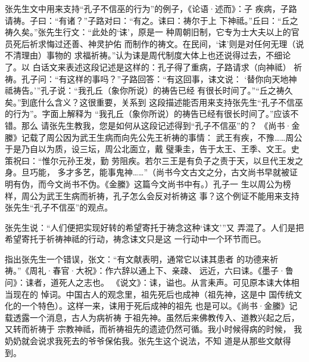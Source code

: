 张先生文中用来支持“孔子不信巫的行为”的例子，《论语·述而》：子
疾病，子路请祷。子曰：“有诸？”子路对曰：“有之。诔曰：祷尔于上
下神祗。”丘曰：“丘之祷久矣。”张先生行文：“此处的‘诔’，原是一
种周朝旧制，它专为士大夫以上的官员死后祈求悔过还善、神灵护佑
而制作的祷文。在民间，‘诔’则是对任何无理（说不清理由）事物的
求福祈祷。”认为诔是周代制度大体上也还说得过去，不细论了。以
白话文来表述这段记述是这样的：孔子得了重病，子路请求（向神祗）
祈祷。孔子问：“有这样的事吗？”子路回答：“有这回事，诔文说：
‘替你向天地神祗祷告。’”孔子说：“我孔丘（象你所说）的祷告已经
有很长时间了。”“丘之祷久矣。”到底什么含义？这很重要，关系到
这段描述能否用来支持张先生“孔子不信巫的行为”。字面上解释为
“我孔丘（象你所说）的祷告已经有很长时间了。”应该不错。那么
请张先生教我，您是如何从这段记述得到“孔子不信巫”的？
《尚书·金縢》记载了周公因为武王生病而向先公先王祈祷的事情：
武王有疾，不豫……周公于是乃自以为质，设三坛，周公北面立，戴
璧秉圭，告于太王、王季、文王。史策祝曰：“惟尔元孙王发，勤
劳阻疾。若尔三王是有负子之责于天，以旦代王发之身。旦巧能，
多才多艺，能事鬼神……”（尚书今文古文之分，古文尚书早就被证
明有伪，而今文尚书不伪。《金縢》这篇今文尚书中有。）孔子一
生以周公为榜样，周公为武王生病而祈祷，孔子怎么会反对祈祷这
事？这个例证不能用来支持张先生“孔子不信巫”的观点。

张先生说：“人们便把实现好转的希望寄托于祷念这种‘诔文’”又
弄混了。人们是把希望寄托于祈祷神祗的行动，祷念诔文只是这
一行动中一个环节而已。

指出张先生一个错误，张文：“有文献表明，通常它以诔其患者
的功德来祈祷。”《周礼·春官·大祝》：作六辞以通上下、亲疎、
远近，六曰诔。《墨子·鲁问》：诔者，道死人之志也。
《说文》：诔，谥也。从言耒声。可见原本诔大体相当现在的
悼词。中国古人的观念里，祖先死后也成神（祖先神，这是中
国传统文化的一个特色）。这样一来，诔用于死后成神的祖先
也是可以。《尚书·金縢》记载透露一个消息，古人为病祈祷
于祖先神。虽然后来佛教传入、道教兴起之后，又转而祈祷于
宗教神祗，而祈祷祖先的遗迹仍然可循。我小时候得病的时候，
我奶奶就会说求我死去的爷爷保佑我。张先生这个说法，不知
道是从那些文献得到。

